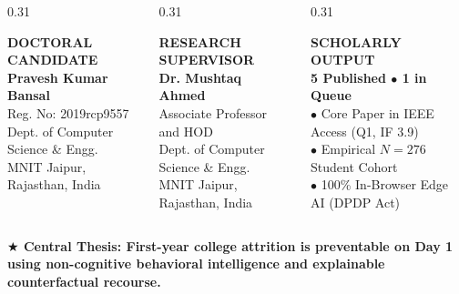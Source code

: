 \documentclass[aspectratio=169, 10pt]{beamer}
\begin{document}
\begin{frame}[plain]
\begin{tcolorbox}[colback=white, colframe=BlueBorder, arc=2.5mm, boxrule=1.5pt, top=2.5mm, bottom=2.5mm, left=4mm, right=4mm]
    \begin{columns}[T]
      \begin{column}{0.31\textwidth}
        \begin{tcolorbox}[colback=BlueLight, colframe=BlueBorder, arc=1.5mm, boxrule=0.8pt, top=1.5mm, bottom=1.5mm]
          \tiny\textbf{\color{BluePrimary} DOCTORAL CANDIDATE}\\[0.05cm]
          \textbf{\scriptsize\color{NavyDark} Pravesh Kumar Bansal}\\
          {\fontsize{6.5pt}{8pt}\selectfont Reg. No: 2019rcp9557\\Dept. of Computer Science \& Engg.\\MNIT Jaipur, Rajasthan, India}
        \end{tcolorbox}
      \end{column}
      \begin{column}{0.31\textwidth}
        \begin{tcolorbox}[colback=BlueLight, colframe=BlueBorder, arc=1.5mm, boxrule=0.8pt, top=1.5mm, bottom=1.5mm]
          \tiny\textbf{\color{BluePrimary} RESEARCH SUPERVISOR}\\[0.05cm]
          \textbf{\scriptsize\color{NavyDark} Dr. Mushtaq Ahmed}\\
          {\fontsize{6.5pt}{8pt}\selectfont Associate Professor and HOD\\Dept. of Computer Science \& Engg.\\MNIT Jaipur, Rajasthan, India}
        \end{tcolorbox}
      \end{column}
      \begin{column}{0.31\textwidth}
        \begin{tcolorbox}[colback=GoldBG, colframe=GoldBorder, arc=1.5mm, boxrule=0.8pt, top=1.5mm, bottom=1.5mm]
          \tiny\textbf{\color{GoldPill} SCHOLARLY OUTPUT}\\[0.05cm]
          \textbf{\scriptsize\color{NavyDark} 5 Published $\bullet$ 1 in Queue}\\
          {\fontsize{6.5pt}{8pt}\selectfont $\bullet$ Core Paper in IEEE Access (Q1, IF 3.9)\\$\bullet$ Empirical $N=276$ Student Cohort\\$\bullet$ 100\% In-Browser Edge AI (DPDP Act)}
        \end{tcolorbox}
      \end{column}
    \end{columns}
    \vspace{0.2cm}

    \begin{tcolorbox}[colback=CanvasBG, colframe=CanvasBorder, arc=1.2mm, boxrule=0.7pt, halign=center, top=1mm, bottom=1mm]
      \tiny\textbf{\color{NavyDark} $\bigstar$ Central Thesis: First-year college attrition is preventable on Day 1 using non-cognitive behavioral intelligence and explainable counterfactual recourse.}
    \end{tcolorbox}
  \end{tcolorbox}
\end{frame}
\end{document}
